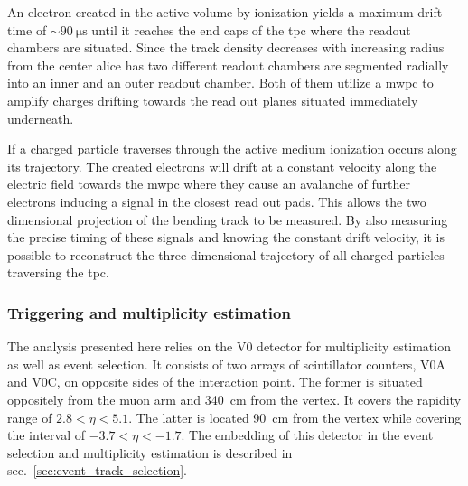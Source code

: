 An electron created in the active volume by ionization yields a maximum drift time of $\sim \SI{90}{\micro \second}$ until it reaches the end caps of the \gls{tpc} where the readout chambers are situated. Since the track density decreases with increasing radius from the center \gls{alice} has two different readout chambers are segmented radially into an inner and an outer readout chamber. Both of them utilize a \gls{mwpc} to amplify charges drifting towards the read out planes situated immediately underneath.

If a charged particle traverses through the active medium ionization occurs along its trajectory. The created electrons will drift at a constant velocity along the electric field towards the \gls{mwpc} where they cause an avalanche of further electrons inducing a signal in the closest read out pads. This allows the two dimensional projection of the bending track to be measured. By also measuring the precise timing of these signals and knowing the constant drift velocity, it is possible to reconstruct the three dimensional trajectory of all charged  particles traversing the \gls{tpc}.


\subsubsection{Triggering and multiplicity estimation}
The analysis presented here relies on the V0 detector for multiplicity estimation as well as event selection. It consists of two arrays of scintillator counters, V0A and V0C, on opposite sides of the interaction point. The former is situated oppositely from the muon arm and \SI{340}{cm} from the vertex. It covers the rapidity range of $2.8 < \eta < 5.1$. The latter is located \SI{90}{cm} from the vertex while covering the interval of $-3.7 < \eta < -1.7$. The embedding of this detector in the event selection and multiplicity estimation is described in sec.~\ref{sec:event_track_selection}.

